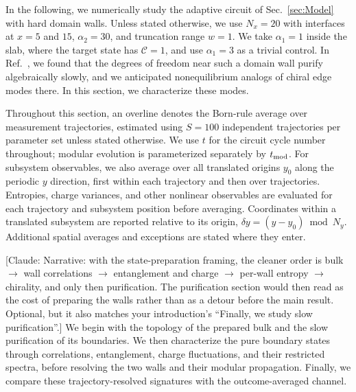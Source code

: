 \documentclass[aps,prb,10pt,twocolumn,superscriptaddress,longbibliography,floatfix]{revtex4-2}
\newcommand{\mc}[1]{\mathcal{#1}}
\newcommand{\claudecom}[1]{{\color{ForestGreen}[Claude: #1]}}
\begin{document}
In the following, we numerically study the adaptive circuit of Sec.~\ref{sec:Model} with hard domain walls. Unless stated otherwise, we use $N_x=20$ with interfaces at $x=5$ and $15$, $\alpha_2=30$, and truncation range $w=1$. We take $\alpha_1=1$ inside the slab, where the target state has $\mc C=1$, and use $\alpha_1=3$ as a trivial control. In Ref.~\cite{BhuiyanPanJian2026}, we found that the degrees of freedom near such a domain wall purify algebraically slowly, and we anticipated nonequilibrium analogs of chiral edge modes there. In this section, we characterize these modes.
{\color{blue}
Throughout this section, an overline denotes the Born-rule average over measurement trajectories, estimated using $S=100$ independent trajectories per parameter set unless stated otherwise. We use $t$ for the circuit cycle number throughout; modular evolution is parameterized separately by $t_{\rm mod}$. For subsystem observables, we also average over all translated origins $y_0$ along the periodic $y$ direction, first within each trajectory and then over trajectories. Entropies, charge variances, and other nonlinear observables are evaluated for each trajectory and subsystem position before averaging. Coordinates within a translated subsystem are reported relative to its origin, $\delta y=(y-y_0)\bmod N_y$. Additional spatial averages and exceptions are stated where they enter.

\claudecom{Narrative: with the state-preparation framing, the cleaner order is bulk $\to$ wall correlations $\to$ entanglement and charge $\to$ per-wall entropy $\to$ chirality, and only then purification. The purification section would then read as the cost of preparing the walls rather than as a detour before the main result. Optional, but it also matches your introduction's ``Finally, we study slow purification''.} We begin with the topology of the prepared bulk and the slow purification of its boundaries. We then characterize the pure boundary states through correlations, entanglement, charge fluctuations, and their restricted spectra, before resolving the two walls and their modular propagation. Finally, we compare these trajectory-resolved signatures with the outcome-averaged channel.
}
\end{document}
